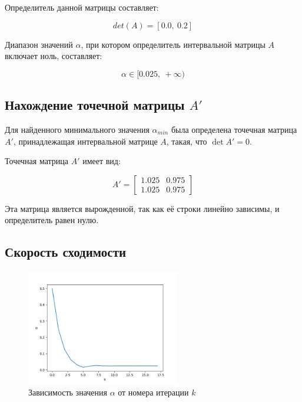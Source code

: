 \documentclass{article}
\begin{document}
  Определитель данной матрицы составляет:

  \[ det(A) = [0.0,\ 0.2] \]

  Диапазон значений \( \alpha \), при котором определитель интервальной
  матрицы \( A \) включает ноль, составляет:

  \[ \alpha \in [0.025,\ +\infty) \]

  \subsection{Нахождение точечной матрицы \( A' \)}

  Для найденного минимального значения \( \alpha_{min} \) была определена
  точечная матрица \( A' \), принадлежащая интервальной матрице \( A \),
  такая, что \( \det A' = 0 \).

  Точечная матрица \( A' \) имеет вид:

  \[
    A' = \begin{bmatrix}
      1.025 & 0.975 \\
      1.025 & 0.975
    \end{bmatrix}
  \]

  Эта матрица является вырожденной, так как её строки линейно зависимы, и
  определитель равен нулю.

  \subsection{Скорость сходимости}

  \begin{figure}[htbp!]
		\begin{center}
			\includegraphics[width = 0.6\textwidth]{values}
			\caption{Зависимость значения \( \alpha \) от номера итерации \( k \)}
      \label{figure:values}
		\end{center}
	\end{figure}
\end{document}
